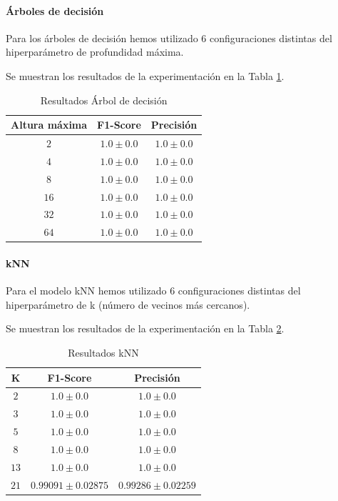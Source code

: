 \documentclass[12pt]{article}
\begin{document}
\paragraph{Árboles de decisión}
Para los árboles de decisión hemos utilizado 6 configuraciones distintas del hiperparámetro de profundidad máxima.

Se muestran los resultados de la experimentación en la Tabla \ref{Tab:DecisionTree_1}.

\begin{table}[!ht]
	\caption{Resultados Árbol de decisión}
	\centering
		 \begin{tabular}{||c c c||}
			 \hline
			 Altura máxima & F1-Score & Precisión  \\ [0.5ex]
			 \hline\hline
			 $2$ & $1.0 \pm 0.0$ & $1.0 \pm 0.0$ \\
			 \hline
			 $4$ & $1.0 \pm 0.0$ & $1.0 \pm 0.0$ \\
			 \hline
			 $8$ & $1.0 \pm 0.0$ & $1.0 \pm 0.0$ \\
			 \hline
			 $16$ & $1.0 \pm 0.0$ & $1.0 \pm 0.0$ \\
			 \hline
			 $32$ & $1.0 \pm 0.0$ & $1.0 \pm 0.0$ \\
			 \hline
			 $64$ & $1.0 \pm 0.0$ & $1.0 \pm 0.0$ \\
			 \hline
		 \end{tabular}
	\label{Tab:DecisionTree_1}
\end{table}

\paragraph{kNN}
Para el modelo kNN hemos utilizado 6 configuraciones distintas del hiperparámetro de k (número de vecinos más cercanos).

Se muestran los resultados de la experimentación en la Tabla \ref{Tab:kNN_1}.

\begin{table}[!ht]
	\caption{Resultados kNN}
	\centering
		 \begin{tabular}{||c c c||}
			 \hline
			 K & F1-Score & Precisión  \\ [0.5ex]
			 \hline\hline
			 $2$ & $1.0 \pm 0.0$ & $1.0 \pm 0.0$ \\
			 \hline
			 $3$ & $1.0 \pm 0.0$ & $1.0 \pm 0.0$ \\
			 \hline
			 $5$ & $1.0 \pm 0.0$ & $1.0 \pm 0.0$ \\
			 \hline
			 $8$ & $1.0 \pm 0.0$ & $1.0 \pm 0.0$ \\
			 \hline
			 $13$ & $1.0 \pm 0.0$ & $1.0 \pm 0.0$ \\
			 \hline
			 $21$ & $0.99091 \pm 0.02875$ & $0.99286 \pm 0.02259$ \\
			 \hline
		 \end{tabular}
	\label{Tab:kNN_1}
\end{table}
\end{document}
